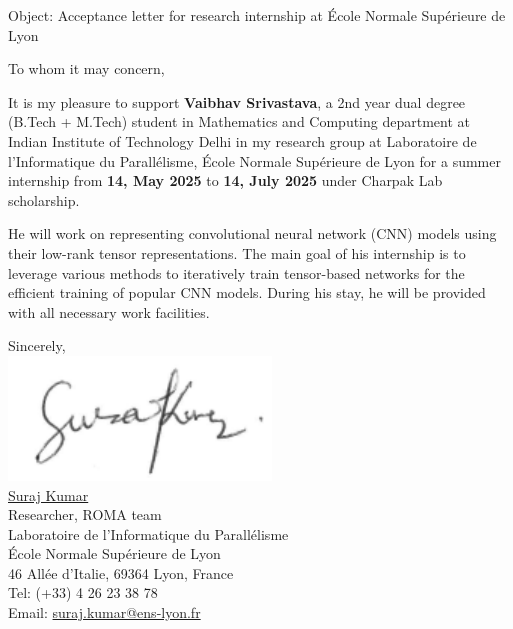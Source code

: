 \documentclass[12pt,a4paper]{lipletter}
\begin{document}
\parindent=0pt
{}
\newcommand{\bu}[1]{{\color{magenta}{\textbf{#1}}}}
\newcommand{\bub}[1]{{\color{blue}{{#1}}}}

\address{Suraj Kumar\\ Researcher, LIP\\ ENS de Lyon, France}

\date{Jan 21, 2025}

\begin{letter}{}
\opening{}
\thispagestyle{firstpage}



Object: Acceptance letter for research internship at École Normale Supérieure de Lyon

\smallskip

To whom it may concern,

It is my pleasure to support \textbf{Vaibhav Srivastava}, a 2nd year dual degree (B.Tech + M.Tech) student in Mathematics and Computing department at Indian Institute of Technology Delhi in my research group at Laboratoire de l'Informatique du Parallélisme, École Normale Supérieure de Lyon for a summer internship from \textbf{14, May 2025} to \textbf{14, July 2025} under Charpak Lab scholarship.




He will work on representing convolutional neural network (CNN) models using their low-rank tensor representations. The main goal of his internship is to leverage various methods to iteratively train tensor-based networks for the efficient training of popular CNN models. During his stay, he will be provided with all necessary work facilities.



\bigskip

{\begin{minipage}{10cm}
		Sincerely,\\\smallskip
		\includegraphics[scale=0.495]{SignatureSuraj2.pdf}\\
		\href{https://surakuma.github.io}{Suraj Kumar}\\
		Researcher, ROMA team\\
		Laboratoire de l'Informatique du Parallélisme\\
		École Normale Supérieure de Lyon\\
		46 Allée d'Italie, 69364 Lyon, France\\
		Tel: (+33) 4 26 23 38 78\\
		Email: \href{mailto:suraj.kumar@ens-lyon.fr}{\url{suraj.kumar@ens-lyon.fr}}		
		

\end{minipage}}
\end{letter}
\end{document}
